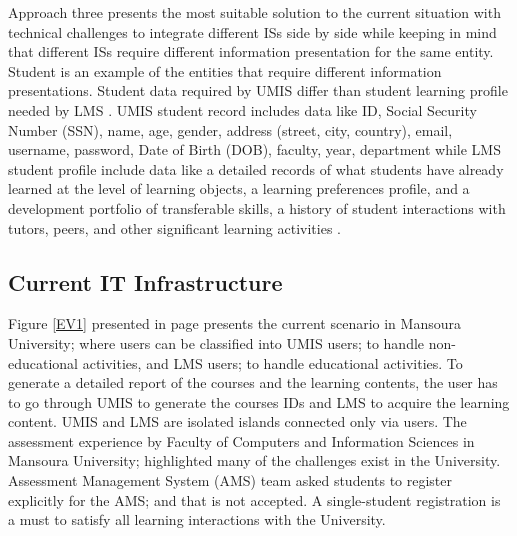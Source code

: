 \documentclass[12pt,a4paper,final,twoside,onecolumn,titlepage]{book}
\begin{document}
Approach three presents the most suitable solution to the current situation with technical challenges to integrate different \gls{IS}s side by side while keeping in mind that different \gls{IS}s require different information presentation for the same entity. Student is an example of the entities that require different information presentations. Student data required by \gls{UMIS} differ than student learning profile needed by \gls{LMS} \cite{EV01}. \gls{UMIS} student record includes data like ID, Social Security Number (SSN), name, age, gender, address (street, city, country), email, username, password, Date of Birth (DOB), faculty, year, department while \gls{LMS} student profile include data like a detailed records of what students have already learned at the level of learning objects, a learning preferences profile, and a development portfolio of transferable skills, a history of student interactions with tutors, peers, and other significant learning activities \cite{EV09}. 

\subsection{Current IT Infrastructure}
Figure \ref{EV1} presented in page \pageref{EV1} presents the current scenario in Mansoura University; where users can be classified into \gls{UMIS} users; to handle non-educational activities, and \gls{LMS} users; to handle educational activities. To generate a detailed report of the courses and the learning contents, the user has to go through \gls{UMIS} to generate the courses IDs and \gls{LMS} to acquire the learning content. \gls{UMIS} and \gls{LMS} are isolated islands connected only via users. The assessment experience by Faculty of Computers and Information Sciences in Mansoura University; highlighted many of the challenges exist in the University. Assessment Management System (AMS) team asked students to register explicitly for the AMS; and that is not accepted. A single-student registration is a must to satisfy all learning interactions with the University.
\end{document}
